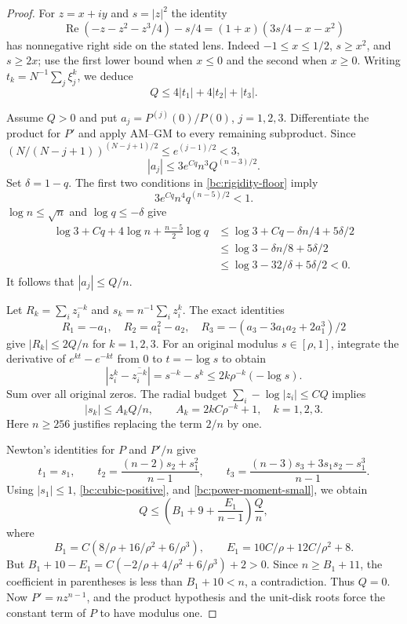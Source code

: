 \documentclass[11pt,reqno]{amsart}
\numberwithin{equation}{section}
\theoremstyle{definition}
\theoremstyle{remark}
\renewcommand{\Re}{\operatorname{Re}}
\begin{document}
\begin{proof}
For $z=x+iy$ and $s=|z|^2$ the identity
\[
 \Re(-z-z^2-z^3/4)-s/4
 =(1+x)(3s/4-x-x^2)
\]
has nonnegative right side on the stated lens.  Indeed
$-1\leq x\leq1/2$, $s\geq x^2$, and $s\geq2x$; use the first
lower bound when $x\leq0$ and the second when $x\geq0$.
Writing $t_k=N^{-1}\sum_j\xi_j^k$, we deduce
\begin{equation}\label{bc:cubic-positive}
 Q\leq4|t_1|+4|t_2|+|t_3|.
\end{equation}

Assume $Q>0$ and put $a_j=P^{(j)}(0)/P(0)$, $j=1,2,3$.
Differentiate the product for $P'$ and apply AM--GM to every remaining
subproduct.  Since $(N/(N-j+1))^{(N-j+1)/2}\leq e^{(j-1)/2}<3$,
\[
 |a_j|\leq3e^{Cq}n^3Q^{(n-3)/2}.
\]
Set $\delta=1-q$.  The first two conditions in
\eqref{bc:rigidity-floor} imply
\[
 3e^{Cq}n^4q^{(n-5)/2}<1.
\]
$\log n\leq\sqrt n$ and $\log q\leq-\delta$ give
\begin{align*}
 \log3+Cq+4\log n+\tfrac{n-5}2\log q
 &\leq\log3+Cq-\delta n/4+5\delta/2\\
 &\leq\log3-\delta n/8+5\delta/2\\
 &\leq\log3-32/\delta+5\delta/2<0.
\end{align*}
It follows that $|a_j|\leq Q/n$.

Let $R_k=\sum_i z_i^{-k}$ and $s_k=n^{-1}\sum_i z_i^k$.  The exact
identities
\[
 R_1=-a_1,\quad R_2=a_1^2-a_2,\quad
 R_3=-(a_3-3a_1a_2+2a_1^3)/2
\]
give $|R_k|\leq2Q/n$ for $k=1,2,3$.  For an original modulus
$s\in[\rho,1]$, integrate the derivative of $e^{kt}-e^{-kt}$ from
$0$ to $t=-\log s$ to obtain
\[
 |z_i^k-\overline{z_i^{-k}}|
 =s^{-k}-s^k\leq2k\rho^{-k}(-\log s).
\]
Sum over all original zeros.  The radial budget
$\sum_i-\log|z_i|\leq CQ$ implies
\begin{equation}\label{bc:power-moment-small}
 |s_k|\leq A_kQ/n,\qquad A_k=2kC\rho^{-k}+1,\quad k=1,2,3.
\end{equation}
Here $n\geq256$ justifies replacing the term $2/n$ by one.

Newton's identities for $P$ and $P'/n$ give
\[
 t_1=s_1,\qquad
 t_2=\frac{(n-2)s_2+s_1^2}{n-1},\qquad
 t_3=\frac{(n-3)s_3+3s_1s_2-s_1^3}{n-1}.
\]
Using $|s_1|\leq1$, \eqref{bc:cubic-positive}, and
\eqref{bc:power-moment-small}, we obtain
\[
 Q\leq\left(B_1+9+\frac{E_1}{n-1}\right)\frac Qn,
\]
where
\[
 B_1=C(8/\rho+16/\rho^2+6/\rho^3),\qquad
 E_1=10C/\rho+12C/\rho^2+8.
\]
But $B_1+10-E_1=C(-2/\rho+4/\rho^2+6/\rho^3)+2>0$.
Since $n\geq B_1+11$, the coefficient in parentheses is less than
$B_1+10<n$, a contradiction.  Thus $Q=0$.
Now $P'=nz^{n-1}$, and the product hypothesis and the unit-disk roots
force the constant term of $P$ to have modulus one.
\end{proof}
\end{document}

